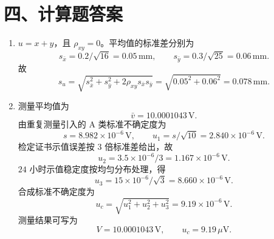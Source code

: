 \documentclass[UTF8,12pt,a4paper]{ctexart}
\begin{document}
\section*{四、计算题答案}
\begin{enumerate}[label=\arabic*、]
\item $u=x+y$，且 $\rho_{xy}=0$。平均值的标准差分别为
\begin{equation*}
    s_{\bar{x}}=0.2/\sqrt{16}=0.05\,\mathrm{mm},\qquad
    s_{\bar{y}}=0.3/\sqrt{25}=0.06\,\mathrm{mm}.
\end{equation*}
故
\begin{equation*}
    s_u=\sqrt{s_{\bar{x}}^2+s_{\bar{y}}^2+2\rho_{xy}s_{\bar{x}}s_{\bar{y}}}
    =\sqrt{0.05^2+0.06^2}=0.078\,\mathrm{mm}.
\end{equation*}

\item 测量平均值为
\begin{equation*}
    \bar{v}=10.0001043\,\mathrm{V}.
\end{equation*}
由重复测量引入的 A 类标准不确定度为
\begin{equation*}
    s=8.982\times10^{-6}\,\mathrm{V},\qquad
    u_1=s/\sqrt{10}=2.840\times10^{-6}\,\mathrm{V}.
\end{equation*}
检定证书示值误差按 $3$ 倍标准差给出，故
\begin{equation*}
    u_2=3.5\times10^{-6}/3=1.167\times10^{-6}\,\mathrm{V}.
\end{equation*}
$24$ 小时示值稳定度按均匀分布处理，得
\begin{equation*}
    u_3=15\times10^{-6}/\sqrt{3}=8.660\times10^{-6}\,\mathrm{V}.
\end{equation*}
合成标准不确定度为
\begin{equation*}
    u_c=\sqrt{u_1^2+u_2^2+u_3^2}=9.19\times10^{-6}\,\mathrm{V}.
\end{equation*}
测量结果可写为
\begin{equation*}
    V=10.0001043\,\mathrm{V},\qquad u_c=9.19\,\mu\mathrm{V}.
\end{equation*}

\newpage


\end{enumerate}
\end{document}
